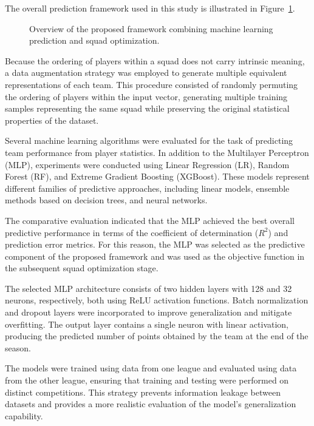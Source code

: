 \documentclass[12pt]{article}
\begin{document}
The overall prediction framework used in this study is illustrated in Figure~\ref{fig:ml_pipeline}.

\begin{figure}[htbp]
\centering

\caption{Overview of the proposed framework combining machine learning prediction and squad optimization.}
\label{fig:ml_pipeline}
\end{figure}

Because the ordering of players within a squad does not carry intrinsic meaning, a data augmentation strategy was employed to generate multiple
equivalent representations of each team. This procedure consisted of randomly permuting the ordering of players within the input vector,
generating multiple training samples representing the same squad while preserving the original statistical properties of the dataset.

Several machine learning algorithms were evaluated for the task of predicting team performance from player statistics. In addition to the
Multilayer Perceptron (MLP), experiments were conducted using Linear Regression (LR), Random Forest (RF), and Extreme Gradient Boosting (XGBoost).
These models represent different families of predictive approaches, including linear models, ensemble methods based on decision trees,
and neural networks.

The comparative evaluation indicated that the MLP achieved the best overall predictive performance in terms of the coefficient of determination
($R^2$) and prediction error metrics. For this reason, the MLP was selected as the predictive component of the proposed framework and was used
as the objective function in the subsequent squad optimization stage.

The selected MLP architecture consists of two hidden layers with 128 and 32 neurons, respectively, both using ReLU activation functions.
Batch normalization and dropout layers were incorporated to improve generalization and mitigate overfitting. The output layer contains a
single neuron with linear activation, producing the predicted number of points obtained by the team at the end of the season.

The models were trained using data from one league and evaluated using data from the other league, ensuring that training and testing were
performed on distinct competitions. This strategy prevents information leakage between datasets and provides a more realistic evaluation of
the model's generalization capability.

\end{document}
